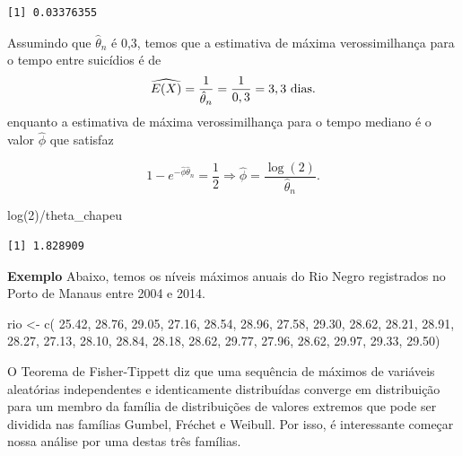 \documentclass[
  letterpaper,
  DIV=11,
  numbers=noendperiod]{scrartcl}
\newenvironment{Shaded}{\begin{snugshade}}{\end{snugshade}}
\newcommand{\DecValTok}[1]{\textcolor[rgb]{0.68,0.00,0.00}{#1}}
\newcommand{\FloatTok}[1]{\textcolor[rgb]{0.68,0.00,0.00}{#1}}
\newcommand{\FunctionTok}[1]{\textcolor[rgb]{0.28,0.35,0.67}{#1}}
\newcommand{\NormalTok}[1]{\textcolor[rgb]{0.00,0.23,0.31}{#1}}
\newcommand{\OtherTok}[1]{\textcolor[rgb]{0.00,0.23,0.31}{#1}}
\newcommand{\SpecialCharTok}[1]{\textcolor[rgb]{0.37,0.37,0.37}{#1}}
\begin{document}
\begin{verbatim}
[1] 0.03376355
\end{verbatim}

Assumindo que \(\hat{\theta}_n\) é 0,3, temos que a estimativa de máxima
verossimilhança para o tempo entre suicídios é de
\[\widehat{E(X)}=\frac{1}{\hat{\theta}_n}=\frac{1}{0,3}=3,3\hbox { dias}.\]
enquanto a estimativa de máxima verossimilhança para o tempo mediano é o
valor \(\hat{\phi}\) que satisfaz

\[1-e^{-\hat{\phi}\hat{\theta}_n}=\frac{1}{2}\Rightarrow \hat{\phi}=\frac{\log(2)}{\hat{\theta}_n}.\]

\begin{Shaded}
\begin{Highlighting}[]
\FunctionTok{log}\NormalTok{(}\DecValTok{2}\NormalTok{)}\SpecialCharTok{/}\NormalTok{theta\_chapeu}
\end{Highlighting}
\end{Shaded}

\begin{verbatim}
[1] 1.828909
\end{verbatim}

\textbf{Exemplo} Abaixo, temos os níveis máximos anuais do Rio Negro
registrados no Porto de Manaus entre 2004 e 2014.

\begin{Shaded}
\begin{Highlighting}[]
\NormalTok{rio }\OtherTok{\textless{}{-}} \FunctionTok{c}\NormalTok{(}
\FloatTok{25.42}\NormalTok{, }\FloatTok{28.76}\NormalTok{, }\FloatTok{29.05}\NormalTok{, }\FloatTok{27.16}\NormalTok{, }\FloatTok{28.54}\NormalTok{, }\FloatTok{28.96}\NormalTok{, }\FloatTok{27.58}\NormalTok{, }\FloatTok{29.30}\NormalTok{, }\FloatTok{28.62}\NormalTok{, }\FloatTok{28.21}\NormalTok{, }\FloatTok{28.91}\NormalTok{, }\FloatTok{28.27}\NormalTok{, }\FloatTok{27.13}\NormalTok{, }\FloatTok{28.10}\NormalTok{, }\FloatTok{28.84}\NormalTok{, }\FloatTok{28.18}\NormalTok{, }\FloatTok{28.62}\NormalTok{, }\FloatTok{29.77}\NormalTok{, }\FloatTok{27.96}\NormalTok{, }\FloatTok{28.62}\NormalTok{, }\FloatTok{29.97}\NormalTok{, }\FloatTok{29.33}\NormalTok{, }\FloatTok{29.50}\NormalTok{)}
\end{Highlighting}
\end{Shaded}

O Teorema de Fisher-Tippett diz que uma sequência de máximos de
variáveis aleatórias independentes e identicamente distribuídas converge
em distribuição para um membro da família de distribuições de valores
extremos que pode ser dividida nas famílias Gumbel, Fréchet e Weibull.
Por isso, é interessante começar nossa análise por uma destas três
famílias.
\end{document}

